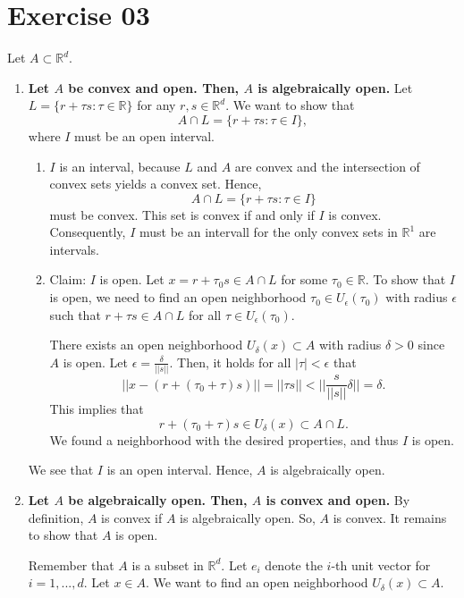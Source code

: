 \documentclass{article}
\begin{document}
\section*{Exercise 03}
Let $A \subset \mathbb{R}^d$. 
\begin{enumerate}
    \item \textbf{Let $A$ be convex and open. Then, $A$ is algebraically open.} Let $L = \{ r + \tau s : \tau \in \mathbb{R}\}$ for any $r,s \in \mathbb{R}^d$. We want to show that 
    $$
        A \cap L = \{ r + \tau s : \tau \in I \},
    $$
    where $I$ must be an open interval.

    \begin{enumerate}
        \item $I$ is an interval, because $L$ and $A$ are convex and the intersection of convex sets yields a convex set. Hence, 
        $$
            A \cap L = \{ r + \tau s : \tau \in I \}
        $$
        must be convex. This set is convex if and only if $I$ is convex. Consequently, $I$ must be an intervall for the only convex sets in $\mathbb{R}^1$ are intervals.        

        \item Claim: $I$ is open. Let $x = r + \tau_0 s  \in A \cap L$ for some $\tau_0 \in \mathbb R$. To show that $I$ is open, we need to find an open neighborhood $\tau_0 \in U_\epsilon(\tau_0)$ with radius $\epsilon$ such that $r+\tau s \in A \cap L$ for all $\tau \in U_\epsilon(\tau_0)$.
        
        There exists an open neighborhood $U_{\delta}(x) \subset A$ with radius $\delta > 0$ since $A$ is open. Let $\epsilon = \frac{\delta}{||s||}$. Then, it holds for all $|\tau| < \epsilon$ that
        $$
            || x - \left(r + (\tau_0 + \tau) s\right)|| = ||\tau s|| < ||\frac{s}{||s||}\delta|| = \delta.
        $$
        This implies that 
        $$
            r + (\tau_0 + \tau) s \in U_\delta(x) \subset A \cap L.
        $$
        We found a neighborhood with the desired properties, and thus $I$ is open.
    \end{enumerate}

    We see that $I$ is an open interval. Hence, $A$ is algebraically open.

    \item \textbf{Let $A$ be algebraically open. Then, $A$ is convex and open.} By definition, $A$ is convex if $A$ is algebraically open. So, $A$ is convex. It remains to show that $A$ is open.
    
    Remember that $A$ is a subset in $\mathbb R^d$. Let $e_i$ denote the $i$-th unit vector for $i=1,...,d$. Let $x \in A$. We want to find an open neighborhood $U_\delta(x) \subset A$.


\end{enumerate}
\end{document}
